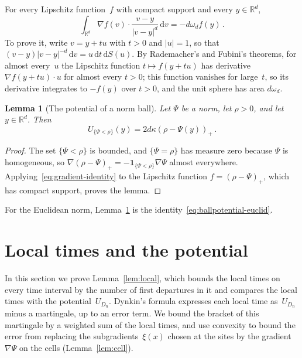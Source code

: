 \documentclass[11pt]{amsart}
\theoremstyle{plain}
\newtheorem{lemma}[theorem]{Lemma}
\theoremstyle{definition}
\newcommand{\R}{\mathbb R}
\newcommand{\drift}{\kappa}
\newcommand{\gauge}{\Psi}
\newcommand{\ind}{\mathbf 1}
\newcommand{\dd}{\,\mathrm d}
\numberwithin{equation}{section}
\begin{document}
For every Lipschitz function~$f$ with compact support and every $y\in\R^d$,
\begin{equation}\label{eq:gradient-identity}
\int_{\R^d}\nabla f(v)\cdot\frac{v-y}{|v-y|^d}\dd v=-d\omega_df(y)\, .
\end{equation}
To prove it, write $v=y+tu$ with $t>0$ and $|u|=1$, so that $(v-y)|v-y|^{-d}\dd v=u\dd t\dd S(u)$. By Rademacher's and Fubini's theorems, for almost every~$u$ the Lipschitz function $t\mapsto f(y+tu)$ has derivative $\nabla f(y+tu)\cdot u$ for almost every $t>0$; this function vanishes for large~$t$, so its derivative integrates to $-f(y)$ over $t>0$, and the unit sphere has area $d\omega_d$.

\begin{lemma}[The potential of a norm ball]\label{lem:ballpotential}
Let $\gauge$ be a norm, let $\rho>0$, and let $y\in\R^d$. Then
\begin{equation}\label{eq:ballpotential}
U_{\{\gauge<\rho\}}(y)=2d\drift(\rho-\gauge(y))_+\, .
\end{equation}
\end{lemma}

\begin{proof}
The set $\{\gauge<\rho\}$ is bounded, and $\{\gauge=\rho\}$ has measure zero because $\gauge$ is homogeneous, so $\nabla(\rho-\gauge)_+=-\ind_{\{\gauge<\rho\}}\nabla \gauge$ almost everywhere. Applying~\eqref{eq:gradient-identity} to the Lipschitz function $f=(\rho-\gauge)_+$, which has compact support, proves the lemma.
\end{proof}

For the Euclidean norm, Lemma~\ref{lem:ballpotential} is the identity~\eqref{eq:ballpotential-euclid}.

\section{Local times and the potential}\label{sec:local}

In this section we prove Lemma~\ref{lem:local}, which bounds the local times on every time interval by the number of first departures in it and compares the local times with the potential~$U_{D_n}$. Dynkin's formula expresses each local time as~$U_{D_n}$ minus a martingale, up to an error term. We bound the bracket of this martingale by a weighted sum of the local times, and use convexity to bound the error from replacing the subgradients~$\xi(x)$ chosen at the sites by the gradient~$\nabla\gauge$ on the cells (Lemma~\ref{lem:cell}).
\end{document}
